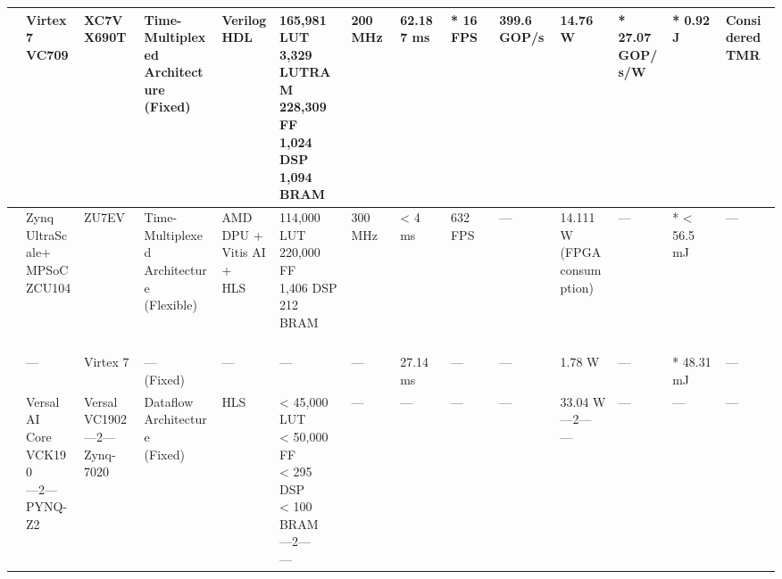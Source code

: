 \begin{center}
{\begin{tabular}{llllllllllllll}
\cite{wangHardwareAccelerationImplementation2022} & \makecell[tl]{Virtex 7\\ VC709} & XC7VX690T & \makecell[tl]{Time-Multiplexed\\ Architecture\\ (Fixed)} & \makecell[tl]{Verilog\\ HDL} & \makecell[tl]{165,981 LUT\\ 3,329 LUTRAM\\ 228,309 FF\\ 1,024 DSP\\ 1,094 BRAM} & 200 MHz & 62.187 ms & * 16 FPS & 399.6 GOP/s & 14.76 W & \makecell[tl]{* 27.07\\ GOP/s/W} & * 0.92 J & \makecell[tl]{Considered\\ TMR}  \\ \hline
\cite{papatheofanousSoCFPGAAcceleration2022} & \makecell[tl]{Zynq\\ UltraScale+\\ MPSoC\\ ZCU104} & ZU7EV & \makecell[tl]{Time-Multiplexed\\ Architecture\\ (Flexible)} & \makecell[tl]{AMD DPU +\\ Vitis AI +\\ HLS} & \makecell[tl]{114,000 LUT\\ 220,000 FF\\ 1,406 DSP\\ 212 BRAM\\ \\} & 300 MHz & < 4 ms & 632 FPS & --- & \makecell[tl]{14.111 W\\ (FPGA\\ consumption)} & --- & * < 56.5 mJ & --- \\ \hline
\cite{jiangRFFingerprintingIdentification2023} & --- & Virtex 7 & \makecell[tl]{---\\ (Fixed)} & --- & --- & --- & 27.14 ms & --- & --- & 1.78 W & --- & * 48.31 mJ & --- \\ \hline
\cite{perrymanEvaluationXilinxVersal2023} & \makecell[tl]{Versal AI\\ Core VCK190\\ ---2---\\ PYNQ-Z2} & \makecell[tl]{Versal\\ VC1902\\ ---2---\\ Zynq-7020} & \makecell[tl]{Dataflow\\ Architecture\\ (Fixed)} & HLS & \makecell[tl]{< 45,000 LUT\\ < 50,000 FF\\ < 295 DSP\\ < 100 BRAM\\ ---2---\\ ---} & --- & --- & --- & --- & \makecell[tl]{33.04 W\\ ---2---\\ ---} & --- & --- & --- \\ \hline

\end{tabular}}
\end{center}
